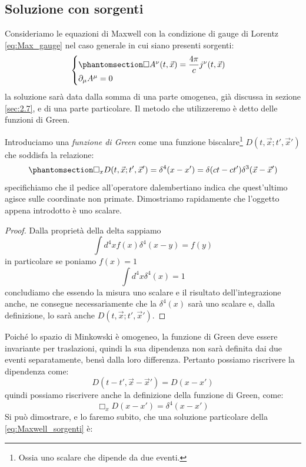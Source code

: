\subsection{Soluzione con sorgenti}
Consideriamo le equazioni di Maxwell con la condizione di gauge di Lorentz \eqref{eq:Max_gauge} nel caso generale in cui siano presenti sorgenti:
\begin{equation}
\begin{cases}\phantomsection\label{eq:Maxwell_sorgenti}
  \Box A^\nu(t,\Vec{x})=\dfrac{4\pi}{c}j^\nu(t,\Vec{x})\\
  \partial_\mu A^\mu=0
\end{cases}
\end{equation}
la soluzione sarà data dalla somma di una parte omogenea, già discussa in sezione \ref{sec:2.7}, e di una parte particolare. Il metodo che utilizzeremo è detto delle funzioni di Green.

Introduciamo una \textit{funzione di Green} come una funzione biscalare\footnote{Ossia uno scalare che dipende da due eventi.} $D(t,\Vec{x};t',\Vec{x}')$ che soddisfa la relazione:
\begin{equation}\phantomsection\label{eq:Def_Green}
    \Box_x D(t,\Vec{x};t',\Vec{x}')=\delta^4(x-x')=\delta(ct-ct')\delta^3(\Vec{x}-\Vec{x}')
\end{equation}
specifichiamo che il pedice all'operatore dalembertiano indica che quest'ultimo agisce sulle coordinate non primate. Dimostriamo rapidamente che l'oggetto appena introdotto è uno scalare.
\begin{proof}
    Dalla proprietà della delta sappiamo
    \begin{equation}
        \int d^4xf(x)\delta^4(x-y)=f(y)
    \end{equation}
    in particolare se poniamo $f(x)=1$
     \begin{equation}
        \int d^4x\delta^4(x)=1
    \end{equation}
    concludiamo che essendo la misura uno scalare e il risultato dell'integrazione anche, ne consegue necessariamente che la $\delta^4(x)$ sarà uno scalare e, dalla definizione, lo sarà anche $D(t,\Vec{x};t',\Vec{x}')$.
    \end{proof}
Poiché lo spazio di Minkowski è omogeneo, la funzione di Green deve essere invariante per traslazioni, quindi la sua dipendenza non sarà definita dai due eventi separatamente, bensì dalla loro differenza. Pertanto possiamo riscrivere la dipendenza come:
\begin{equation}
   D(t-t',\Vec{x}-\Vec{x}')=D(x-x')
\end{equation}
quindi possiamo riscrivere anche la definizione della funzione di Green, come:
\begin{equation}
    \Box_x D(x-x')=\delta^4(x-x')
\end{equation}
Si può dimostrare, e lo faremo subito, che una soluzione particolare della \eqref{eq:Maxwell_sorgenti} è:

